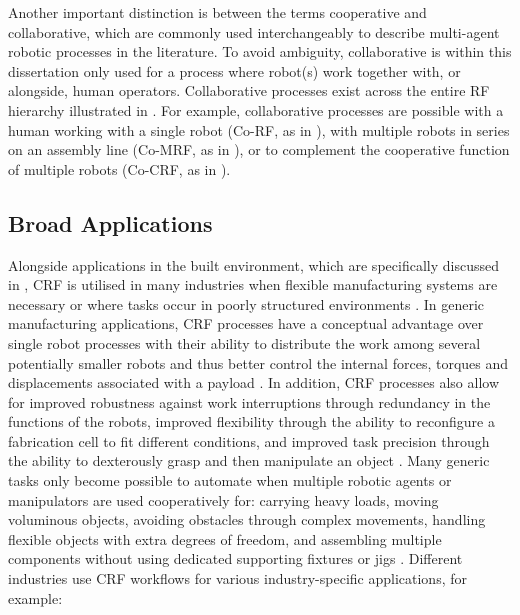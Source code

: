     Another important distinction is between the terms cooperative and collaborative, which are commonly used interchangeably to describe multi-agent robotic processes in the literature. To avoid ambiguity, collaborative is within this dissertation only used for a process where robot(s) work together with, or alongside, human operators. Collaborative processes exist across the entire RF hierarchy illustrated in . For example, collaborative processes are possible with a human working with a single robot (Co-RF, as in \cite{asadi_pictobot_2018}), with multiple robots in series on an assembly line (Co-MRF, as in \cite{weckenborg_balancing_2020}), or to complement the cooperative function of multiple robots (Co-CRF, as in \cite{bruun_humanrobot_2020}).
    
\subsection{Broad Applications} \label{sec:1_apps}
    Alongside applications in the built environment, which are specifically discussed in , CRF is utilised in many industries when flexible manufacturing systems are necessary or where tasks occur in poorly structured environments \citep{caccavale_cooperative_2016}. In generic manufacturing applications, CRF processes have a conceptual advantage over single robot processes with their ability to distribute the work among several potentially smaller robots and thus better control the internal forces, torques and displacements associated with a payload \citep{montemayor_decentralized_2005}. In addition, CRF processes also allow for improved robustness against work interruptions through redundancy in the functions of the robots, improved flexibility through the ability to reconfigure a fabrication cell to fit different conditions, and improved task precision through the ability to dexterously grasp and then manipulate an object \citep{gudino-lau_dynamic_2005, montemayor_decentralized_2005}. Many generic tasks only become possible to automate when multiple robotic agents or manipulators are used cooperatively for: carrying heavy loads, moving voluminous objects, avoiding obstacles through complex movements, handling flexible objects with extra degrees of freedom, and assembling multiple components without using dedicated supporting fixtures or jigs \citep{gan_cooperative_2012,caccavale_cooperative_2016, li_neural_2018}. Different industries use CRF workflows for various industry-specific applications, for example:

